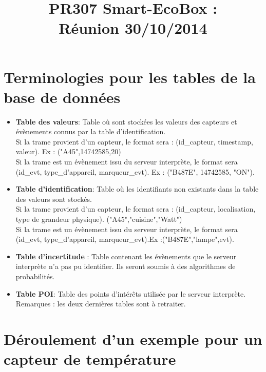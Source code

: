 \documentclass[10pt,a4paper]{article}
\title{PR307 Smart-EcoBox : \\ Réunion 30/10/2014}
\begin{document}
\maketitle

\section {Terminologies pour les tables de la base de données}
\begin{itemize}
\item \textbf{Table des valeurs}: Table où sont stockées les valeurs des capteurs et évènements connus par la table d'identification.\\
Si la trame provient d'un capteur, le format sera : (id\_capteur, timestamp, valeur). Ex : ("A45",14742585,20)\\
Si la trame est un évènement issu du serveur interprète, le format sera (id\_evt, type\_d'appareil, marqueur\_evt). Ex : ("B487E", 14742585, "ON").
\item \textbf{Table d'identification}: Table où les identifiants non existants dans la table des valeurs sont stockés.\\ 
Si la trame provient d'un capteur, le format sera : (id\_capteur, localisation, type de grandeur physique). ("A45","cuisine","Watt")\\
Si la trame est un évènement issu du serveur interprète, le format sera (id\_evt, type\_d'appareil, marqueur\_evt).Ex :("B487E","lampe",evt).
\item \textbf{Table d'incertitude} : Table contenant les évènements que le serveur interprète n'a pas pu identifier. Ils seront soumis à des algorithmes de probabilités.
\item \textbf{Table POI}: Table des points d'intérêts utilisée par le serveur interprète. 
Remarques : les deux dernières tables sont à retraiter.
\end{itemize}

\section{Déroulement d'un exemple pour un capteur de température}
\end{document}
